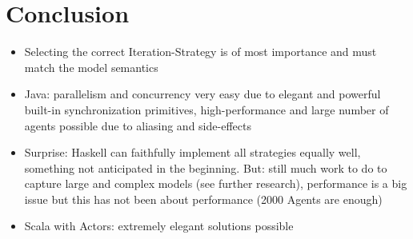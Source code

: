 \section{Conclusion}
\begin{itemize}
	\item Selecting the correct Iteration-Strategy is of most importance and must match the model semantics
	
	\item Java: parallelism and concurrency very easy due to elegant and powerful built-in synchronization primitives, high-performance and large number of agents possible due to aliasing and side-effects
	
	\item Surprise: Haskell can faithfully implement all strategies equally well, something not anticipated in the beginning. But: still much work to do to capture large and complex models (see further research), performance is a big issue but this has not been about performance (2000 Agents are enough)
	
	\item Scala with Actors: extremely elegant solutions possible
\end{itemize} 
